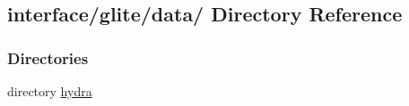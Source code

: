 \hypertarget{dir_000002}{
\subsection{interface/glite/data/ Directory Reference}
\label{dir_000002}
}
\subsubsection*{Directories}
\begin{CompactItemize}
\item 
directory \hyperlink{dir_000003}{hydra}
\end{CompactItemize}
